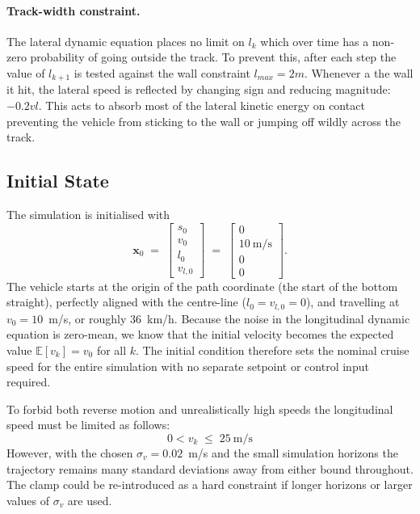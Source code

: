 \documentclass{article}
\begin{document}
\paragraph{Track-width constraint.}
The lateral dynamic equation places no limit on $l_k$ which over time has a non-zero probability of going outside the track. To prevent this, after each step the value of $l_{k+1}$ is tested against the wall constraint $l_{max} =2m$. Whenever a the wall it hit, the lateral speed is reflected by changing sign and reducing magnitude: $-0.2vl$. This acts to absorb most of the lateral kinetic energy on contact preventing the vehicle from sticking to the wall or jumping off wildly across the track.

\subsection{Initial State}
\label{subsec:initial}

The simulation is initialised with
\begin{equation}
    \mathbf{x}_0 \;=\; \begin{bmatrix} s_0 \\ v_0 \\ l_0 \\ v_{l,0} \end{bmatrix}
    \;=\; \begin{bmatrix} 0 \\ 10~\text{m/s} \\ 0 \\ 0 \end{bmatrix}.
    \label{eq:x0}
\end{equation}
The vehicle starts at the origin of the path coordinate (the start of the bottom straight), perfectly aligned with the centre-line ($l_0 = v_{l,0} = 0$), and travelling at $v_0 = 10$~m/s, or roughly $36$~km/h. Because the noise in the longitudinal dynamic equation is zero-mean, we know that the initial velocity becomes the expected value  $\mathbb{E}[v_k] = v_0$ for all $k$. The initial condition therefore sets the nominal cruise speed for the entire simulation with no separate setpoint or control input required.

To forbid both reverse motion and unrealistically high speeds the longitudinal speed must be limited as follows:
\begin{equation}
    0 < v_k \;\leq\; 25~\text{m/s}
\end{equation}
However, with the chosen $\sigma_v = 0.02$~m/s and the small simulation horizons the trajectory remains many standard deviations away from either bound throughout. The clamp could be re-introduced as a hard constraint if longer horizons or larger values of $\sigma_v$ are used.
\end{document}
